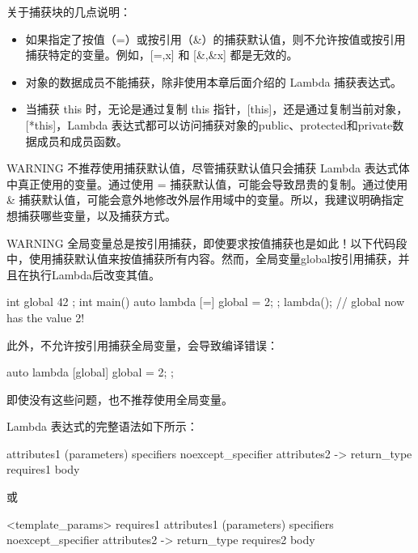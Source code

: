 关于捕获块的几点说明：

\begin{itemize}
\item
如果指定了按值（=）或按引用（\&）的捕获默认值，则不允许按值或按引用捕获特定的变量。例如，[=,x] 和 [\&,\&x] 都是无效的。

\item
对象的数据成员不能捕获，除非使用本章后面介绍的 Lambda 捕获表达式。

\item
当捕获 this 时，无论是通过复制 this 指针，[this]，还是通过复制当前对象，[*this]，Lambda 表达式都可以访问捕获对象的public、protected和private数据成员和成员函数。
\end{itemize}

\begin{myWarning}{WARNING}
不推荐使用捕获默认值，尽管捕获默认值只会捕获 Lambda 表达式体中真正使用的变量。通过使用 = 捕获默认值，可能会导致昂贵的复制。通过使用 \& 捕获默认值，可能会意外地修改外层作用域中的变量。所以，我建议明确指定想捕获哪些变量，以及捕获方式。
\end{myWarning}

\begin{myWarning}{WARNING}
全局变量总是按引用捕获，即使要求按值捕获也是如此！以下代码段中，使用捕获默认值来按值捕获所有内容。然而，全局变量global按引用捕获，并且在执行Lambda后改变其值。

\begin{cpp}
int global { 42 };
int main()
{
    auto lambda { [=] { global = 2; } };
    lambda();
    // global now has the value 2!
}
\end{cpp}

此外，不允许按引用捕获全局变量，会导致编译错误：

\begin{cpp}
auto lambda { [global] { global = 2; } };
\end{cpp}

即使没有这些问题，也不推荐使用全局变量。
\end{myWarning}

Lambda 表达式的完整语法如下所示：

\begin{cpp}
 attributes1 (parameters) specifiers noexcept_specifier attributes2
    -> return_type requires1 {body}
\end{cpp}

或

\begin{cpp}
 <template_params> requires1 attributes1 (parameters) specifiers
    noexcept_specifier attributes2 -> return_type requires2 {body}
\end{cpp}

